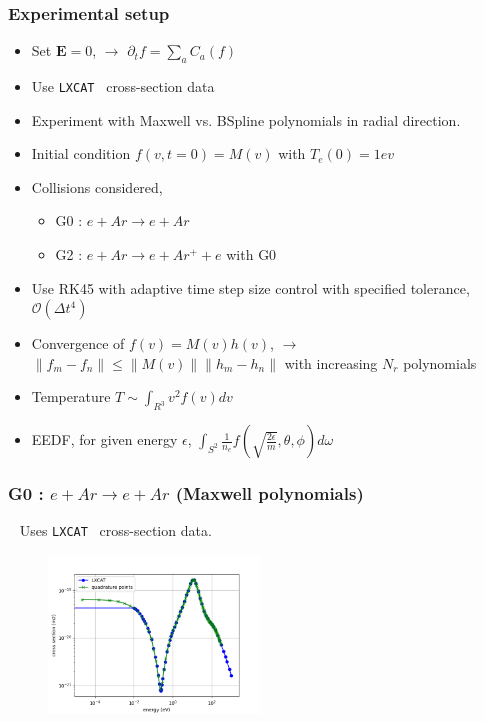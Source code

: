 \documentclass[mathserif, aspectratio=169]{beamer}
\newcommand{\vect}[1]{\boldsymbol{#1}}
\newcommand{\norm}[1]{\left\lVert#1\right\rVert}
\newcommand{\lxcat}{\texttt{LXCAT}}
\begin{document}
	\begin{frame}
		\frametitle{Experimental setup}
		\begin{itemize}
			\item Set $\vect{E}=0$, $\rightarrow$ $\partial_t f = \sum_{a} C_a(f)$
			\item Use \lxcat~ cross-section data %
			\item Experiment with Maxwell vs. BSpline polynomials in radial direction. 
			\item Initial condition $f(v,t=0) = M(v)$ with $T_e(0)=1ev$ %
			\item Collisions considered, 
			\begin{itemize}
				\item G0 : $e + Ar \rightarrow e + Ar$
				\item G2 : $e + Ar \rightarrow e + Ar^+ + e$ with G0
			\end{itemize}
			\item Use RK45 with adaptive time step size control with specified tolerance, $\mathcal{O}(\Delta t ^4)$
			\item Convergence of $f(v) = M(v) h(v)$,  $\rightarrow$ $\norm{f_{m}- f_{n}} \leq \norm{M(v)} \norm{h_m-h_n}$ with increasing $N_r$ polynomials
			\item Temperature $T \sim \int_{R^3} v^2 f(v) dv$
			\item EEDF, for given energy $\epsilon$, $\int_{S^2} \frac{1}{n_e} f(\sqrt{\frac{2\epsilon}{m}},\theta,\phi) d\omega$
		\end{itemize}
	\end{frame}

	\begin{frame}
		\frametitle{G0 : $e + Ar \rightarrow e + Ar$ (Maxwell polynomials)}
		\textbullet~ Uses \lxcat~ cross-section data.
		\begin{figure}
				\centering
				\includegraphics[width=0.5\textwidth]{g0_tcs.png}
		\end{figure}
	\end{frame}
\end{document}
